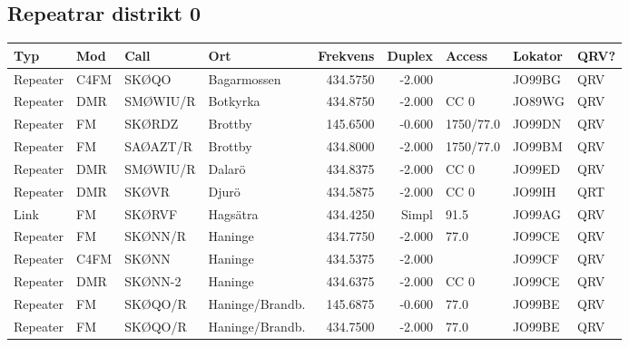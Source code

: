 \begin{landscape}

\subsection{Repeatrar distrikt 0}

\begin{longtable}{llllrrlll}
	\bf Typ           & \bf Mod            & \bf Call & \bf Ort         & \bf Frekvens & \bf Duplex & \bf Access & \bf Lokator & \bf QRV? \\ \hline
	\endhead
Repeater & C4FM               & SKØQO    & Bagarmossen     &     434.5750 &     -2.000 &            & JO99BG      & QRV      \\
	Repeater          & DMR                & SMØWIU/R & Botkyrka        &     434.8750 &     -2.000 & CC 0       & JO89WG      & QRV      \\
	Repeater          & FM                 & SKØRDZ   & Brottby         &     145.6500 &     -0.600 & 1750/77.0  & JO99DN      & QRV      \\
	Repeater          & FM                 & SAØAZT/R & Brottby         &     434.8000 &     -2.000 & 1750/77.0  & JO99BM      & QRV      \\
	Repeater          & DMR                & SMØWIU/R & Dalarö          &     434.8375 &     -2.000 & CC 0       & JO99ED      & QRV      \\
	Repeater          & DMR                & SKØVR    & Djurö           &     434.5875 &     -2.000 & CC 0       & JO99IH      & QRT      \\
	Link              & FM                 & SKØRVF   & Hagsätra        &     434.4250 &      Simpl & 91.5       & JO99AG      & QRV      \\
	Repeater          & FM                 & SKØNN/R  & Haninge         &     434.7750 &     -2.000 & 77.0       & JO99CE      & QRV      \\
	Repeater          & C4FM               & SKØNN    & Haninge         &     434.5375 &     -2.000 &            & JO99CF      & QRV      \\
	Repeater          & DMR                & SKØNN-2  & Haninge         &     434.6375 &     -2.000 & CC 0       & JO99CE      & QRV      \\
	Repeater          & FM                 & SKØQO/R  & Haninge/Brandb. &     145.6875 &     -0.600 & 77.0       & JO99BE      & QRV      \\
	Repeater          & FM                 & SKØQO/R  & Haninge/Brandb. &     434.7500 &     -2.000 & 77.0       & JO99BE      & QRV      \\

\end{longtable}
\end{landscape}
